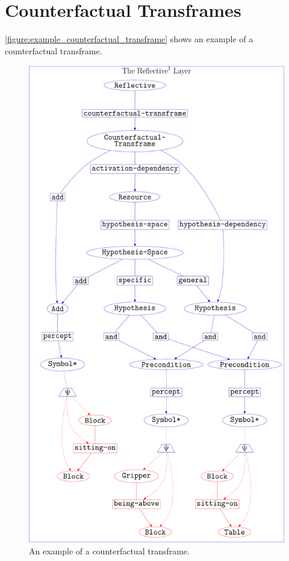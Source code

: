 \section{Counterfactual Transframes}

{\mbox{\autoref{figure:example_counterfactual_transframe}}} shows an
example of a counterfactual transframe.
\begin{figure}
\center
\includegraphics[width=12cm]{gfx/example_counterfactual_transframe}
\caption[An example of a counterfactual transframe.]{An example of a
  counterfactual transframe.}
\label{figure:example_counterfactual_transframe}
\end{figure}

